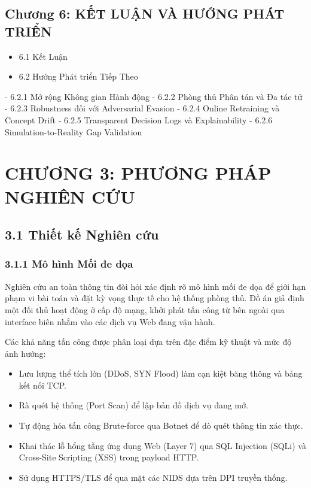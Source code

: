\documentclass[12pt,a4paper,twoside]{report}
\begin{document}
{\section{Chương 6: KẾT LUẬN VÀ HƯỚNG PHÁT TRIỂN}
\begin{itemize}
\item 6.1 Kết Luận
\item 6.2 Hướng Phát triển Tiếp Theo
\end{itemize}
- 6.2.1 Mở rộng Không gian Hành động
- 6.2.2 Phòng thủ Phân tán và Đa tác tử
- 6.2.3 Robustness đối với Adversarial Evasion
- 6.2.4 Online Retraining và Concept Drift
- 6.2.5 Transparent Decision Logs và Explainability
- 6.2.6 Simulation-to-Reality Gap Validation


\chapter*{CHƯƠNG 3: PHƯƠNG PHÁP NGHIÊN CỨU}

\section{3.1 Thiết kế Nghiên cứu}

\subsection{3.1.1 Mô hình Mối đe dọa}

Nghiên cứu an toàn thông tin đòi hỏi xác định rõ mô hình mối đe dọa để giới hạn phạm vi bài toán và đặt kỳ vọng thực tế cho hệ thống phòng thủ. Đồ án giả định một đối thủ hoạt động ở cấp độ mạng, khởi phát tấn công từ bên ngoài qua interface biên nhắm vào các dịch vụ Web đang vận hành.

Các khả năng tấn công được phân loại dựa trên đặc điểm kỹ thuật và mức độ ảnh hưởng:
\begin{itemize}
\item Lưu lượng thể tích lớn (DDoS, SYN Flood) làm cạn kiệt băng thông và bảng kết nối TCP.
\item Rà quét hệ thống (Port Scan) để lập bản đồ dịch vụ đang mở.
\item Tự động hóa tấn công Brute-force qua Botnet để dò quét thông tin xác thực.
\item Khai thác lỗ hổng tầng ứng dụng Web (Layer 7) qua SQL Injection (SQLi) và Cross-Site Scripting (XSS) trong payload HTTP.
\item Sử dụng HTTPS/TLS để qua mặt các NIDS dựa trên DPI truyền thống.
\end{itemize}

}
\end{document}
